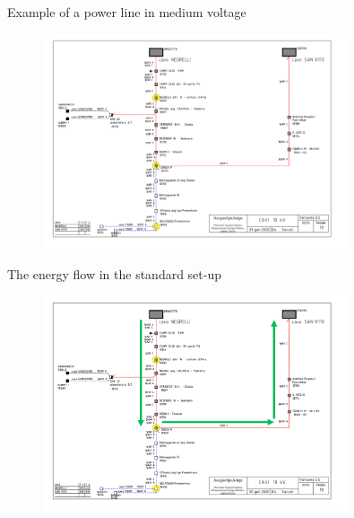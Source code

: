 \documentclass[10pt, aspectratio=169, compress, protectframetitle, handout]{beamer}
\begin{document}
\begin{frame}{Example of a power line in medium voltage}
    \vspace{-5pt}
    \begin{figure}
        \centering
        \includegraphics[width=0.8\textwidth]{figures/Rete_TS_1.png}
    \end{figure}
\end{frame}

\begin{frame}{The energy flow in the standard set-up}
    \vspace{-5pt}
    \begin{figure}
        \centering
        \includegraphics[width=0.8\textwidth]{figures/Rete_TS_2.png}
    \end{figure}
\end{frame}
\end{document}
